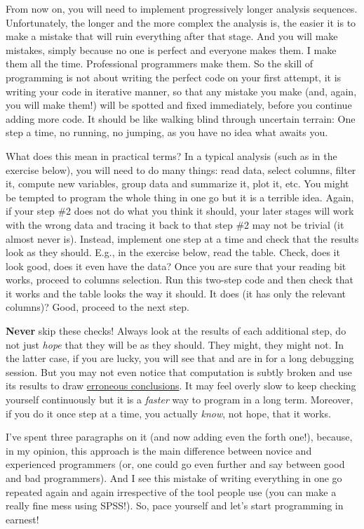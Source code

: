 \documentclass[
]{book}
\begin{document}
From now on, you will need to implement progressively longer analysis sequences. Unfortunately, the longer and the more complex the analysis is, the easier it is to make a mistake that will ruin everything after that stage. And you will make mistakes, simply because no one is perfect and everyone makes them. I make them all the time. Professional programmers make them. So the skill of programming is not about writing the perfect code on your first attempt, it is writing your code in iterative manner, so that any mistake you make (and, again, you will make them!) will be spotted and fixed immediately, before you continue adding more code. It should be like walking blind through uncertain terrain: One step a time, no running, no jumping, as you have no idea what awaits you.

What does this mean in practical terms? In a typical analysis (such as in the exercise below), you will need to do many things: read data, select columns, filter it, compute new variables, group data and summarize it, plot it, etc. You might be tempted to program the whole thing in one go but it is a terrible idea. Again, if your step \#2 does not do what you think it should, your later stages will work with the wrong data and tracing it back to that step \#2 may not be trivial (it almost never is). Instead, implement one step at a time and check that the results look as they should. E.g., in the exercise below, read the table. Check, does it look good, does it even have the data? Once you are sure that your reading bit works, proceed to columns selection. Run this two-step code and then check that it works and the table looks the way it should. It does (it has only the relevant columns)? Good, proceed to the next step.

\textbf{Never} skip these checks! Always look at the results of each additional step, do not just \emph{hope} that they will be as they should. They might, they might not. In the latter case, if you are lucky, you will see that and are in for a long debugging session. But you may not even notice that computation is subtly broken and use its results to draw \href{https://www.powerusersoftwares.com/post/2016/08/11/the-excel-formula-error-that-initiated-austerity-policies-after-the-crisis}{erroneous conclusions}. It may feel overly slow to keep checking yourself continuously but it is a \emph{faster} way to program in a long term. Moreover, if you do it once step at a time, you actually \emph{know}, not hope, that it works.

I've spent three paragraphs on it (and now adding even the forth one!), because, in my opinion, this approach is the main difference between novice and experienced programmers (or, one could go even further and say between good and bad programmers). And I see this mistake of writing everything in one go repeated again and again irrespective of the tool people use (you can make a really fine mess using SPSS!). So, pace yourself and let's start programming in earnest!
\end{document}
